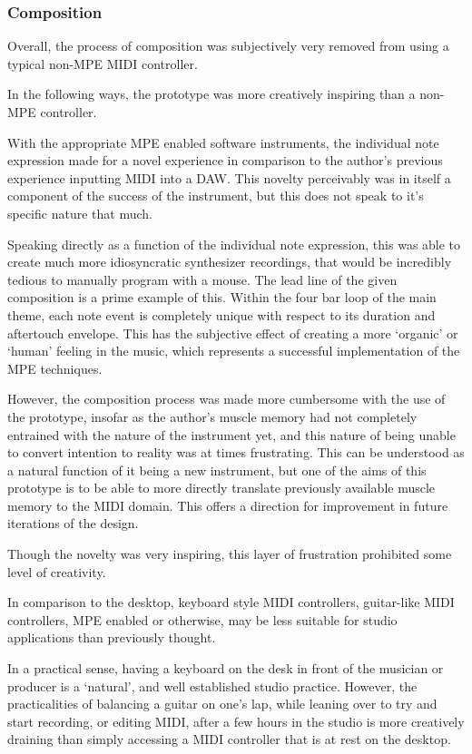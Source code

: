 \subsubsection{Composition}
Overall, the process of composition was subjectively very removed from using a typical non-MPE MIDI controller.

In the following ways, the prototype was more creatively inspiring than a non-MPE controller.
 
With the appropriate MPE enabled software instruments, the individual note expression made for a novel experience in comparison to the author's previous experience inputting MIDI into a DAW. This novelty perceivably was in itself a component of the success of the instrument, but this does not speak to it's specific nature that much. 

Speaking directly as a function of the individual note expression, this was able to create much more idiosyncratic synthesizer recordings, that would be incredibly tedious to manually program with a mouse. The lead line of the given composition is a prime example of this. Within the four bar loop of the main theme, each note event is completely unique with respect to its duration and aftertouch envelope. This has the subjective effect of creating a more `organic' or `human' feeling in the music, which represents a successful implementation of the MPE techniques.

However, the composition process was made more cumbersome with the use of the prototype, insofar as the author's muscle memory had not completely entrained with the nature of the instrument yet, and this nature of being unable to convert intention to reality was at times frustrating. This can be understood as a natural function of it being a new instrument, but one of the aims of this prototype is to be able to more directly translate previously available muscle memory to the MIDI domain. This offers a direction for improvement in future iterations of the design.

Though the novelty was very inspiring, this layer of frustration prohibited some level of creativity.

In comparison to the desktop, keyboard style MIDI controllers, guitar-like MIDI controllers, MPE enabled or otherwise, may be less suitable for studio applications than previously thought. 

In a practical sense, having a keyboard on the desk in front of the musician or producer is a `natural', and well established studio practice. However, the practicalities of balancing a guitar on one's lap, while leaning over to try and start recording, or editing MIDI, after a few hours in the studio is more creatively draining than simply accessing a MIDI controller that is at rest on the desktop. 

